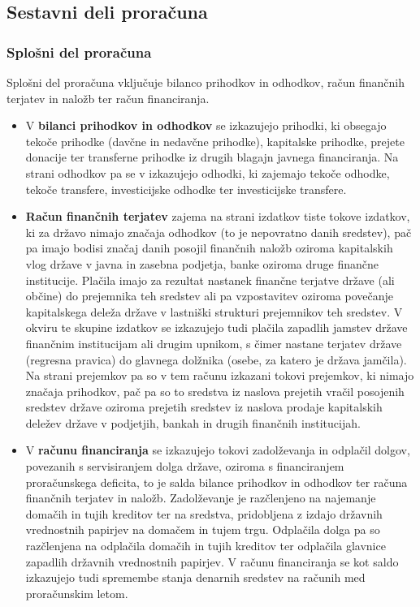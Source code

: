 \documentclass[12pt, a4paper]{article}
\begin{document}
\subsection[Sestavni deli proračuna]{Sestavni deli proračuna}
\subsubsection[Splošno del proračuna]{Splošni del proračuna}
Splošni del proračuna vključuje bilanco prihodkov in odhodkov, račun finančnih terjatev in naložb ter račun financiranja.
\begin{itemize}
\item V \textbf{bilanci prihodkov in odhodkov} se izkazujejo prihodki, ki obsegajo tekoče prihodke (davčne in nedavčne prihodke), kapitalske prihodke, prejete donacije ter transferne prihodke iz drugih blagajn javnega financiranja. Na strani odhodkov pa se v izkazujejo odhodki, ki zajemajo tekoče odhodke, tekoče transfere, investicijske odhodke ter investicijske transfere.

\item \textbf{Račun finančnih terjatev} zajema na strani izdatkov tiste tokove izdatkov, ki za državo nimajo značaja odhodkov (to je nepovratno danih sredstev), pač pa imajo bodisi značaj danih posojil finančnih naložb oziroma kapitalskih vlog države v javna in zasebna podjetja, banke oziroma druge finančne institucije. Plačila imajo za rezultat nastanek finančne terjatve države (ali občine) do prejemnika teh sredstev ali pa vzpostavitev oziroma povečanje kapitalskega deleža države v lastniški strukturi prejemnikov teh sredstev. V okviru te skupine izdatkov se izkazujejo tudi plačila zapadlih jamstev države finančnim institucijam ali drugim upnikom, s čimer nastane terjatev države (regresna pravica) do glavnega dolžnika (osebe, za katero je država jamčila). Na strani prejemkov pa so v tem računu izkazani tokovi prejemkov, ki nimajo značaja prihodkov, pač pa so to sredstva iz naslova prejetih vračil posojenih sredstev države oziroma prejetih sredstev iz naslova prodaje kapitalskih deležev države v podjetjih, bankah in drugih finančnih institucijah.

\item V \textbf{računu financiranja} se izkazujejo tokovi zadolževanja in odplačil dolgov, povezanih s servisiranjem dolga države, oziroma s financiranjem proračunskega deficita, to je salda bilance prihodkov in odhodkov ter računa finančnih terjatev in naložb. Zadolževanje je razčlenjeno na najemanje domačih in tujih kreditov ter na sredstva, pridobljena z izdajo državnih vrednostnih papirjev na domačem in tujem trgu. Odplačila dolga pa so razčlenjena na odplačila domačih in tujih kreditov ter odplačila glavnice zapadlih državnih vrednostnih papirjev. V računu financiranja se kot saldo izkazujejo tudi spremembe stanja denarnih sredstev na računih med proračunskim letom.
\end{itemize}
\end{document}
